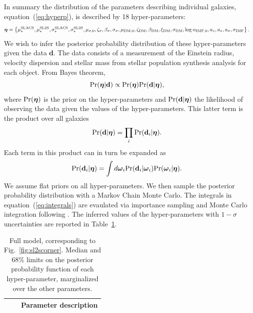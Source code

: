 \documentclass[usenatbib]{mnras}
\newcommand{\boldsymbol}[1]{\mbox{\boldmath{${#1}$}}}
\def\pr{{\rm Pr}}
\def\hyperp{\boldsymbol{\eta}}
\def\indpari{\boldsymbol{\omega}_i}
\def\datad{\mathbf{d}}
\def\datadi{\mathbf{d}_i}
\def\Fref#1{Fig.~\ref{#1}\xspace}
\def\Tref#1{Table~\ref{#1}\xspace}
\def\Eref#1{equation~(\ref{#1})\xspace}
\begin{document}
In summary the distribution of the parameters describing individual galaxies, \Eref{eq:hyperp}, is described by 18 hyper-parameters:
\begin{equation}
\hyperp = \left\{\mu_*^{\mathrm{SLACS}}, \mu_*^{\mathrm{SL2S}}, \sigma_*^{\mathrm{SLACS}}, \sigma_*^{\mathrm{SL2S}}, \mu_{\sigma,0}, \zeta_\sigma, \beta_\sigma, \sigma_\sigma, \mu_{\mathrm{DM}, 0}, \zeta_{\mathrm{DM}}, \beta_{\mathrm{DM}}, \xi_{\mathrm{DM}}, \sigma_{\mathrm{DM}}, \log{\alpha_{\mathrm{IMF}, 0}}, a_z, a_*, a_\sigma, \sigma_{\mathrm{IMF}} \right\}.
\end{equation}
We wish to infer the posterior probability distribution of these hyper-parameters given the data $\datad$.
The data consists of a measurement of the Einstein radius, velocity dispersion and stellar mass from stellar population synthesis analysis for each object.
From Bayes theorem, 
\begin{equation}
\pr(\hyperp|\datad) \propto \pr(\hyperp)\pr(\datad|\hyperp),
\end{equation}
where $\pr(\hyperp)$ is the prior on the hyper-parameters and $\pr(\datad|\hyperp)$ the likelihood of observing the data given the values of the hyper-parameters.
This latter term is the product over all galaxies
\begin{equation}
\pr(\datad|\hyperp) = \prod_i \pr(\datadi|\hyperp).
\end{equation}
Each term in this product can in turn be expanded as
\begin{equation}\label{eq:integrals}
\pr(\datadi|\hyperp) = \int d\indpari \pr(\datadi|\indpari) \pr(\indpari|\hyperp).
\end{equation}
We assume flat priors on all hyper-parameters.
We then sample the posterior probability distribution with a Markov Chain Monte Carlo. 
The integrals in \Eref{eq:integrals} are evaulated via importance sampling and Monte Carlo integration following \citet{Sch++15}.
The inferred values of the hyper-parameters with $1-\sigma$ uncertainties are reported in \Tref{tab:hyperp}.
\begin{table}
 \caption{Full model, corresponding to \Fref{fig:sl2scorner}. Median and $68\%$ limits on the posterior probability function of each hyper-parameter, marginalized over the other parameters.}
 \label{tab:hyperp}
 \begin{tabular}{lcl}
 \hline
 & & Parameter description \\
 \hline
 
 \hline
 \end{tabular}
\end{table}
\end{document}
